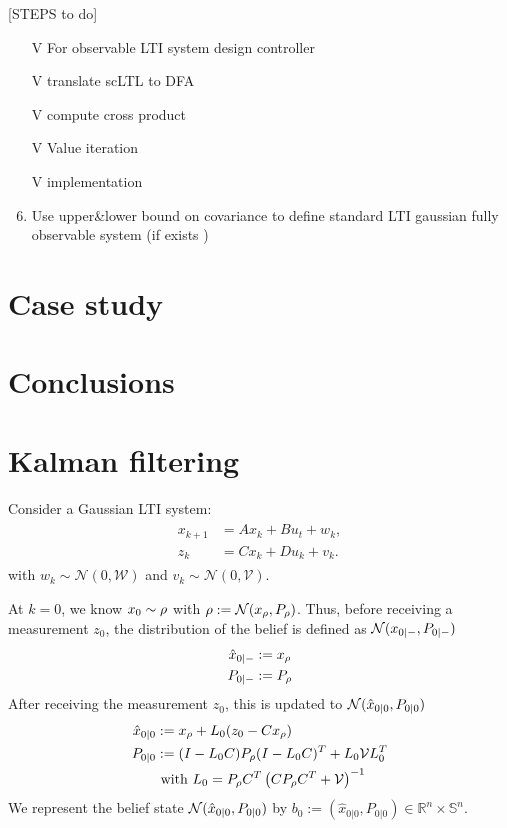 \documentclass{ifacconf}
\newcommand{\red}[1]{{\color{red} #1}}
\begin{document}
 \noindent{\textbf{}}

    
    \red{[STEPS to do]
  \begin{enumerate}
  	\item[V] For observable LTI system design controller
  	\item[V] translate scLTL to DFA
  	\item[V] compute cross product
  	\item[V] Value iteration
  	\item[V] implementation
  	  	\item Use upper\&lower bound on covariance to define standard LTI gaussian fully observable system (if exists )  
  \end{enumerate}
  
  
  }

\section{Case study}
    
\section{Conclusions}






\appendix

\section{Kalman filtering}
Consider a Gaussian LTI system:
 \begin{align}  \begin{aligned}
x_{k+1}&=A x_{k} + B u_t+ w_k,\\
z_k&=Cx_k+Du_k+v_k.\end{aligned} \end{align}
with $w_k\sim \mathcal N(0, \mathcal W)$ and $v_k\sim \mathcal N (0,\mathcal V)$.

At $k=0$, we know $x_0\sim \rho$ with $\rho:=\mathcal N(x_\rho,P_\rho)$.
Thus,  before receiving a measurement $z_0$, the distribution of the belief is defined as $\mathcal{N}(x_{0|-}, P_{0|-})$
\begin{align}
	\hat x_{0|-}&:= x_\rho\\
	P_{0|-}&:= P_{\rho}
\end{align}
After receiving the measurement $z_0$, this is updated to $\mathcal{N}(\hat x_{0|0}, P_{0|0})$
\begin{align}
	\hat x_{0|0}&:= x_\rho+ L_0 (z_0-Cx_\rho)\\
	P_{0|0}&:=(I-L_0 C) P_{\rho}(I-L_0 C)^T+L_0\mathcal{V} L_0^T\\
	& \mbox{ with } L_0=P_{\rho}C^T\left(CP_{\rho}C^T+\mathcal V\right)^{-1}
\end{align}
We represent the belief state  $\mathcal{N}(\hat x_{0|0}, P_{0|0})$ by $b_0:=(\hat x_{0|0}, P_{0|0})\in\mathbb R^n\times \mathbb S^n$.
\end{document}
